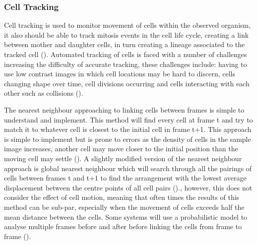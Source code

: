 \documentclass[12pt a4paper]{article}
\begin{document}
        \subsubsection{Cell Tracking}
        Cell tracking is used to monitor movement of cells within the observed organism, it also should be able to track mitosis events in the cell life cycle, creating a link between mother and daughter cells, in turn creating a lineage associated to the tracked cell (\cite{thirusittampalam}). Automated tracking of cells is faced with a number of challenges increasing the difficulty of accurate tracking, these challenges include: having to use low contrast images in which cell locations may be hard to discern, cells changing shape over time, cell divisions occurring and cells interacting with each other such as collisions (\cite{thirusittampalam}).
        
        The nearest neighbour approaching to linking cells between frames is simple to understand and implement. This method will find every cell at frame t and try to match it to whatever cell is closest to the initial cell in frame t+1. This approach is simple to implement but is prone to errors as the density of cells in the sample image increases, another cell may move closer to the initial position than the moving cell may settle (\cite{DORN2008497}). A slightly modified version of the nearest neighbour approach is global nearest neighbour which will search through all the pairings of cells between frames t and t+1 to find the arrangement with the lowest average displacement between the centre points of all cell pairs (\cite{DORN2008497})., however, this does not consider the effect of cell motion, meaning that often times the results of this method can be sub-par, especially when the movement of cells exceeds half the mean distance between the cells. Some systems will use a probabilistic model to analyse multiple frames before and after before linking the cells from frame to frame (\cite{DORN2008497}). 
        
\end{document}
